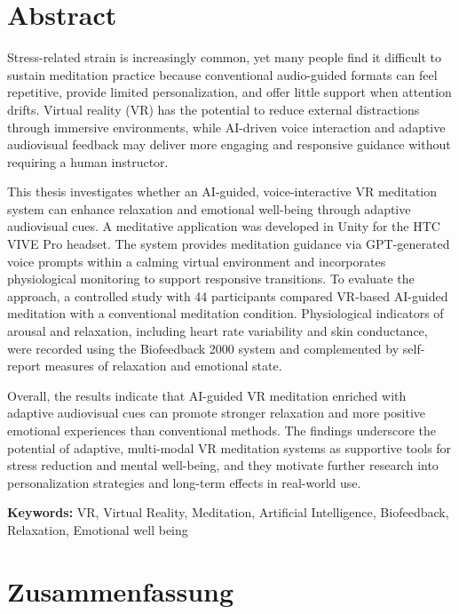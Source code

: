 \chapter*{Abstract}

Stress-related strain is increasingly common, yet many people find it difficult to sustain meditation practice because conventional audio-guided formats can feel repetitive, provide limited personalization, and offer little support when attention drifts. Virtual reality (VR) has the potential to reduce external distractions through immersive environments, while AI-driven voice interaction and adaptive audiovisual feedback may deliver more engaging and responsive guidance without requiring a human instructor.

This thesis investigates whether an AI-guided, voice-interactive VR meditation system can enhance relaxation and emotional well-being through adaptive audiovisual cues. A meditative application was developed in Unity for the HTC VIVE Pro headset. The system provides meditation guidance via GPT-generated voice prompts within a calming virtual environment and incorporates physiological monitoring to support responsive transitions. To evaluate the approach, a controlled study with 44 participants compared VR-based AI-guided meditation with a conventional meditation condition. Physiological indicators of arousal and relaxation, including heart rate variability and skin conductance, were recorded using the Biofeedback 2000 system and complemented by self-report measures of relaxation and emotional state.

Overall, the results indicate that AI-guided VR meditation enriched with adaptive audiovisual cues can promote stronger relaxation and more positive emotional experiences than conventional methods. The findings underscore the potential of adaptive, multi-modal VR meditation systems as supportive tools for stress reduction and mental well-being, and they motivate further research into personalization strategies and long-term effects in real-world use.

\vspace{1cm}
\textbf{Keywords:} VR, Virtual Reality, Meditation, Artificial Intelligence, Biofeedback, Relaxation, Emotional well being
\clearpage
\chapter*{Zusammenfassung}

